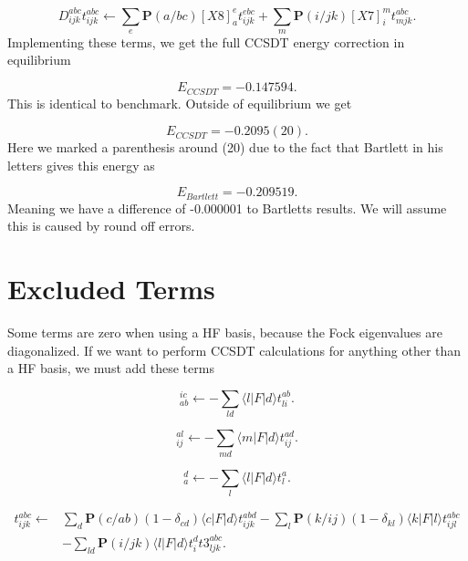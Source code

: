 \documentclass[a4paper,norsk,11pt,twoside]{report}
\begin{document}
\begin{equation}
D_{ijk}^{abc} t_{ijk}^{abc} \leftarrow \sum_e \textbf{P}(a/bc) [X8]_a^e t_{ijk}^{ebc}
+ \sum_m \textbf{P}(i/jk) [X7]_i^m  
t_{mjk}^{abc} .
\end{equation}
Implementing these terms, we get the full CCSDT energy correction in equilibrium

\begin{equation}
E_{CCSDT} = -0.147594 .
\end{equation}
This is identical to benchmark. Outside of equilibrium we get

\begin{equation}
E_{CCSDT} = -0.2095(20) .
\end{equation}
Here we marked a parenthesis around (20) due to the fact that Bartlett in his letters gives this energy as

\begin{equation}
E_{Bartlett} = -0.209519 .
\end{equation}
Meaning we have a difference of -0.000001 to Bartletts results. We will assume this is caused by round off errors.  

\section{Excluded Terms}
Some terms are zero when using a HF basis, because the Fock eigenvalues are diagonalized. If we want to perform CCSDT calculations for anything other than a HF basis, we must add these terms

\begin{equation}
[X1]_{ab}^{ic} \leftarrow - \sum_{ld} \langle l | F | d \rangle t_{li}^{ab} .
\end{equation}

\begin{equation}
[X15]_{ij}^{al} \leftarrow - \sum_{md} \langle m | F | d \rangle t_{ij}^{ad} .
\end{equation}

\begin{equation}
[X8]_a^d \leftarrow - \sum_l \langle l | F | d \rangle t_l^a .
\end{equation}

\begin{align}
t_{ijk}^{abc} \leftarrow &
\sum_d \textbf{P}(c/ab)
(1 - \delta_{cd}) \langle c | F | d \rangle t_{ijk}^{abd}
- \sum_l \textbf{P}(k/ij) 
(1 - \delta_{kl}) \langle k | F | l \rangle  t_{ijl}^{abc}
\nonumber \\ &
-
\sum_{ld}
\textbf{P}(i/jk)
\langle l | F | d \rangle t_i^d  t3^{abc}_{ljk} .
\end{align}
\end{document}
